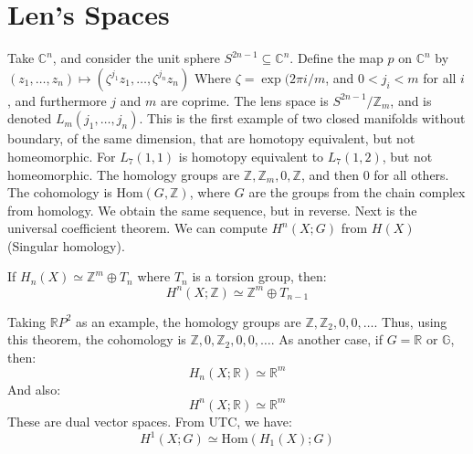 \documentclass[crop=false,class=book,oneside]{standalone}
\begin{document}
    \section{Len's Spaces}
        Take $\mathbb{C}^{n}$, and consider the unit
        sphere $S^{2n-1}\subseteq\mathbb{C}^{n}$. Define
        the map $p$ on $\mathbb{C}^{n}$ by
        $(z_{1},\dots,z_{n})\mapsto%
         (\zeta^{j_{1}}z_{1},\dots,\zeta^{j_{n}}z_{n})$
        Where $\zeta=\exp(2\pi{i}/m$, and
        $0<j_{i}<m$ for all $i$, and furthermore
        $j$ and $m$ are coprime. The lens space is
        $S^{2n-1}/\mathbb{Z}_{m}$, and is denoted
        $L_{m}(j_{1},\dots,j_{n})$. This is the first
        example of two closed manifolds without
        boundary, of the same dimension, that are
        homotopy equivalent, but not homeomorphic.
        For $L_{7}(1,1)$ is homotopy equivalent to
        $L_{7}(1,2)$, but not homeomorphic. The
        homology groups are
        $\mathbb{Z},\mathbb{Z}_{m},0,\mathbb{Z}$, and
        then $0$ for all others. The cohomology is
        $\mathrm{Hom}(G,\mathbb{Z})$, where $G$ are
        the groups from the chain complex from homology.
        We obtain the same sequence, but in reverse.
        Next is the universal coefficient theorem. We
        can compute $H^{n}(X;G)$ from
        $H(X)$ (Singular homology).
        \begin{theorem}
            If $H_{n}(X)\simeq\mathbb{Z}^{m}\oplus{T}_{n}$
            where $T_{n}$ is a torsion group, then:
            \begin{equation}
                H^{n}(X;\mathbb{Z})\simeq
                \mathbb{Z}^{m}\oplus{T}_{n-1}
            \end{equation}
        \end{theorem}
        Taking $\mathbb{R}P^{2}$ as an example, the
        homology groups are
        $\mathbb{Z},\mathbb{Z}_{2},0,0,\dots$. Thus, using
        this theorem, the cohomology is
        $\mathbb{Z},0,\mathbb{Z}_{2},0,0,\dots$. As
        another case, if $G=\mathbb{R}$ or $\mathbb{G}$,
        then:
        \begin{equation}
            H_{n}(X;\mathbb{R})\simeq\mathbb{R}^{m}
        \end{equation}
        And also:
        \begin{equation}
            H^{n}(X;\mathbb{R})\simeq\mathbb{R}^{m}
        \end{equation}
        These are dual vector spaces. From UTC, we have:
        \begin{equation}
            H^{1}(X;G)\simeq
            \mathrm{Hom}(H_{1}(X);G)
        \end{equation}
\end{document}
